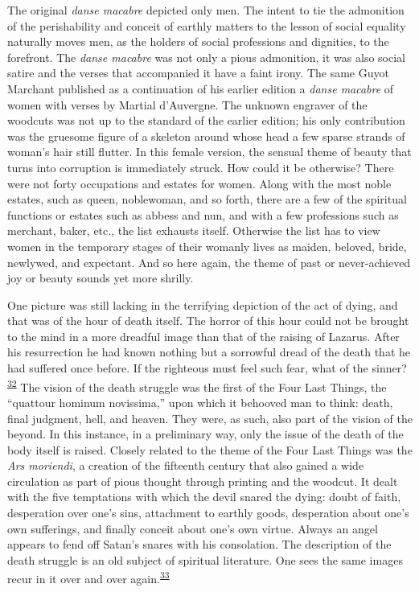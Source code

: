 The original \emph{danse macabre} depicted only men. The intent to tie
the admonition of the perishability and conceit of earthly matters to
the lesson of social equality naturally moves men, as the holders of
social professions and dignities, to the forefront. The \emph{danse
macabre} was not only a pious admonition, it was also social satire and
\protect\hypertarget{12_Chapter_Five__THE_VISION_OF_DEAT.xhtmlux5cux23page_167}{}{}the
verses that accompanied it have a faint irony. The same Guyot Marchant
published as a continuation of his earlier edition a \emph{danse
macabre} of women with verses by Martial d'Auvergne. The unknown
engraver of the woodcuts was not up to the standard of the earlier
edition; his only contribution was the gruesome figure of a skeleton
around whose head a few sparse strands of woman's hair still flutter. In
this female version, the sensual theme of beauty that turns into
corruption is immediately struck. How could it be otherwise? There were
not forty occupations and estates for women. Along with the most noble
estates, such as queen, noblewoman, and so forth, there are a few of the
spiritual functions or estates such as abbess and nun, and with a few
professions such as merchant, baker, etc., the list exhausts itself.
Otherwise the list has to view women in the temporary stages of their
womanly lives as maiden, beloved, bride, newlywed, and expectant. And so
here again, the theme of past or never-achieved joy or beauty sounds yet
more shrilly.

One picture was still lacking in the terrifying depiction of the act of
dying, and that was of the hour of death itself. The horror of this hour
could not be brought to the mind in a more dreadful image than that of
the raising of Lazarus. After his resurrection he had known nothing but
a sorrowful dread of the death that he had suffered once before. If the
righteous must feel such fear, what of the
sinner?\textsuperscript{\protect\hypertarget{12_Chapter_Five__THE_VISION_OF_DEAT.xhtmlux5cux23id_1288}{\protect\hyperlink{23_NOTES.xhtmlux5cux23id_1289}{32}}}
The vision of the death struggle was the first of the Four Last Things,
the ``quattour hominum novissima,'' upon which it behooved man to think:
death, final judgment, hell, and heaven. They were, as such, also part
of the vision of the beyond. In this instance, in a preliminary way,
only the issue of the death of the body itself is raised. Closely
related to the theme of the Four Last Things was the \emph{Ars
moriendi}, a creation of the fifteenth century that also gained a wide
circulation as part of pious thought through printing and the woodcut.
It dealt with the five temptations with which the devil snared the
dying: doubt of faith, desperation over one's sins, attachment to
earthly goods, desperation about one's own sufferings, and finally
conceit about one's own virtue. Always an angel appears to fend off
Satan's snares with his consolation. The description of the death
struggle is an old subject of spiritual literature. One sees the same
images recur in it over and over
again.\textsuperscript{\protect\hypertarget{12_Chapter_Five__THE_VISION_OF_DEAT.xhtmlux5cux23id_1286}{\protect\hyperlink{23_NOTES.xhtmlux5cux23id_1287}{33}}}

